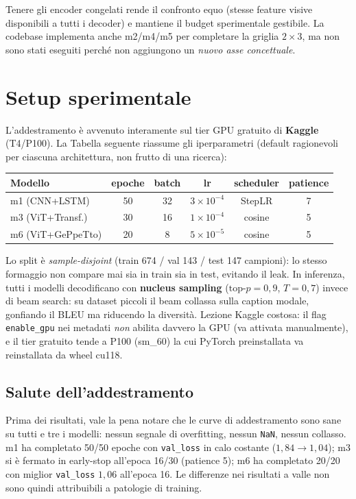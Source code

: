\documentclass[11pt,a4paper]{article}
\begin{document}
Tenere gli encoder congelati rende il confronto equo (stesse feature visive
disponibili a tutti i decoder) e mantiene il budget sperimentale gestibile. La
codebase implementa anche m2/m4/m5 per completare la griglia $2\times3$, ma non
sono stati eseguiti perch\'e non aggiungono un \emph{nuovo asse concettuale}.

\section{Setup sperimentale}

L'addestramento \`e avvenuto interamente sul tier GPU gratuito di
\textbf{Kaggle} (T4/P100). La Tabella seguente riassume gli iperparametri
(default ragionevoli per ciascuna architettura, non frutto di una ricerca):

\begin{center}\small
\begin{tabular}{@{}lccccc@{}}
\toprule
\textbf{Modello} & \textbf{epoche} & \textbf{batch} & \textbf{lr} & \textbf{scheduler} & \textbf{patience} \\
\midrule
m1 (CNN+LSTM) & 50 & 32 & $3\!\times\!10^{-4}$ & StepLR & 7 \\
m3 (ViT+Transf.) & 30 & 16 & $1\!\times\!10^{-4}$ & cosine & 5 \\
m6 (ViT+GePpeTto) & 20 & 8 & $5\!\times\!10^{-5}$ & cosine & 5 \\
\bottomrule
\end{tabular}
\end{center}

Lo split \`e \emph{sample-disjoint} (train 674 / val 143 / test 147 campioni):
lo stesso formaggio non compare mai sia in train sia in test, evitando il leak.
In inferenza, tutti i modelli decodificano con \textbf{nucleus sampling}
($\text{top-}p=0{,}9$, $T=0{,}7$) invece di beam search: su dataset piccoli il
beam collassa sulla caption modale, gonfiando il BLEU ma riducendo la
diversit\`a. Lezione Kaggle costosa: il flag \texttt{enable\_gpu} nei metadati
\emph{non} abilita davvero la GPU (va attivata manualmente), e il tier gratuito
tende a P100 (sm\_60) la cui PyTorch preinstallata va reinstallata da wheel
cu118.

\subsection{Salute dell'addestramento}
Prima dei risultati, vale la pena notare che le curve di addestramento sono
sane su tutti e tre i modelli: nessun segnale di overfitting, nessun
\texttt{NaN}, nessun collasso. m1 ha completato 50/50 epoche con
\texttt{val\_loss} in calo costante ($1{,}84 \rightarrow 1{,}04$); m3 si \`e
fermato in early-stop all'epoca 16/30 (patience 5); m6 ha completato 20/20 con
miglior \texttt{val\_loss} $1{,}06$ all'epoca 16. Le differenze nei risultati a
valle non sono quindi attribuibili a patologie di training.
\end{document}
